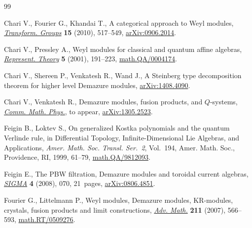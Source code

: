 \begin{thebibliography}{99}
\footnotesize \itemsep=0pt

Chari V., Fourier G., Khandai T., A categorical approach to {W}eyl modules,
  \href{http://dx.doi.org/10.1007/s00031-010-9090-9}{\textit{Transform. Groups}} \textbf{15} (2010), 517--549, \href{http://arxiv.org/abs/0906.2014}{arXiv:0906.2014}.

Chari V., Pressley A., Weyl modules for classical and quantum af\/fine algebras,
  \href{http://dx.doi.org/10.1090/S1088-4165-01-00115-7}{\textit{Represent. Theory}} \textbf{5} (2001), 191--223,
  \href{http://arxiv.org/abs/math.QA/0004174}{math.QA/0004174}.

Chari V., Shereen P., Venkatesh R., Wand J., A Steinberg type decomposition
  theorem for higher level Demazure modules, \href{http://arxiv.org/abs/1408.4090}{arXiv:1408.4090}.

Chari V., Venkatesh R., Demazure modules, fusion products, and $Q$-systems,
  \href{http://dx.doi.org/10.1007/s00220-014-2175-x}{\textit{Comm. Math. Phys.}}, {t}o appear, \href{http://arxiv.org/abs/1305.2523}{arXiv:1305.2523}.

Feigin B., Loktev S., On generalized {K}ostka polynomials and the quantum
  {V}erlinde rule, in Dif\/ferential Topology, Inf\/inite-Dimensional {L}ie
  Algebras, and Applications, \textit{Amer. Math. Soc. Transl. Ser.~2}, Vol.~194, Amer. Math. Soc., Providence, RI, 1999, 61--79,
  \href{http://arxiv.org/abs/math.QA/9812093}{math.QA/9812093}.

Feigin E., The {PBW} f\/iltration, {D}emazure modules and toroidal current
  algebras, \href{http://dx.doi.org/10.3842/SIGMA.2008.070}{\textit{SIGMA}} \textbf{4} (2008), 070, 21~pages,
  \href{http://arxiv.org/abs/0806.4851}{arXiv:0806.4851}.

Fourier G., Littelmann P., Weyl modules, {D}emazure modules, {KR}-modules,
  crystals, fusion products and limit constructions, \href{http://dx.doi.org/10.1016/j.aim.2006.09.002}{\textit{Adv. Math.}}
  \textbf{211} (2007), 566--593, \href{http://arxiv.org/abs/math.RT/0509276}{math.RT/0509276}.


\end{thebibliography}
